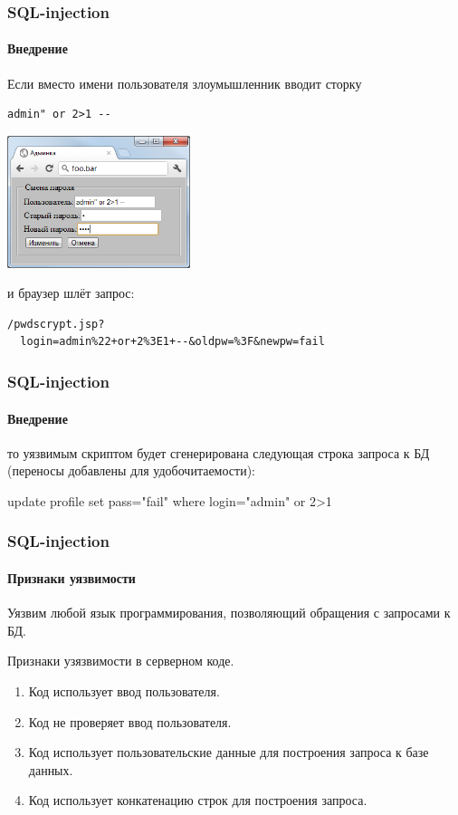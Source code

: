 \begin{frame}[fragile]
    \frametitle{SQL-injection}
    \framesubtitle{Внедрение}
    
    Если вместо имени пользователя злоумышленник вводит сторку
\begin{verbatim}
admin" or 2>1 --
\end{verbatim}
    
    \includegraphics[width=0.4\textwidth]{fig/htmlformhack.png}
    
    и браузер шлёт запрос:
\begin{verbatim}
/pwdscrypt.jsp?
  login=admin%22+or+2%3E1+--&oldpw=%3F&newpw=fail
\end{verbatim}
\end{frame}


\begin{frame}[fragile]
    \frametitle{SQL-injection}
    \framesubtitle{Внедрение}
    
    то уязвимым скриптом будет сгенерирована следующая строка запроса к БД (переносы добавлены для удобочитаемости):
    \begin{semiverbatim}
update profile set pass="fail" 
  where login="admin" or 2>1 
    \end{semiverbatim}
    
\end{frame}


\begin{frame}
    \frametitle{SQL-injection}
    \framesubtitle{Признаки уязвимости}
    
    Уязвим любой язык программирования, позволяющий обращения с запросами к БД.
    
    Признаки узязвимости в серверном коде.
    \begin{enumerate}
        \item Код использует ввод пользователя.
        \item Код не проверяет ввод пользователя.
        \item Код использует пользовательские данные для построения запроса к базе данных.
        \item Код использует конкатенацию строк для построения запроса.
    \end{enumerate}
\end{frame}

